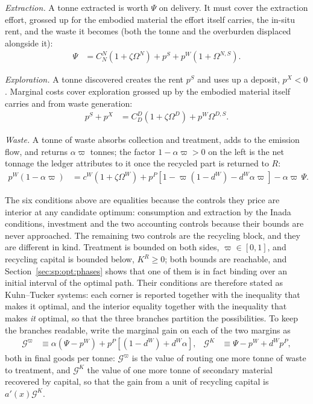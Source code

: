 \emph{Extraction.} A tonne extracted is worth $\Psi$ on delivery. It must cover the extraction effort, grossed up for the embodied material the effort itself carries, the in-situ rent, and the waste it becomes (both the tonne and the overburden displaced alongside it):
\begin{align}
\Psi &= C^N_N\left(1+\zeta\Omega^N\right)+p^S+p^W\left(1+\Omega^{N,S}\right).
\label{eq:sp:sum:N}
\end{align}

\emph{Exploration.} A tonne discovered creates the rent $p^S$ and uses up a deposit, $p^X<0$. Marginal costs cover exploration grossed up by the embodied material itself carries and from waste generation:  
\begin{align}
p^S+p^X &= C^D_D\left(1+\zeta\Omega^D\right)+p^W\Omega^{D,S} .
\label{eq:sp:sum:D}
\end{align}

\emph{Waste.} A tonne of waste absorbs collection and treatment, adds to the emission flow, and returns $\alpha\varpi$ tonnes; the factor $1-\alpha\varpi>0$ on the left is the net tonnage the ledger attributes to it once the recycled part is returned to $R$:
\begin{align}
p^W\left(1-\alpha\varpi\right) &= c^W\left(1+\zeta\Omega^W\right)+p^P\left[1-\varpi\left(1-d^W\right)-d^W\alpha\varpi\right]-\alpha\varpi\,\Psi .
\label{eq:sp:sum:W}
\end{align}

 The six conditions above are equalities because the controls
they price are interior at any candidate optimum: consumption and extraction by the Inada conditions,
investment and the two accounting controls because their bounds are never approached. The remaining
two controls are the recycling block, and they are different in kind. Treatment is bounded on both
sides, $\varpi\in\left[0,1\right]$, and recycling capital is bounded below, $K^R\ge0$; both bounds are
reachable, and Section~\ref{sec:sp:opt:phases} shows that one of them is in fact binding over an
initial interval of the optimal path. Their conditions are therefore stated as Kuhn--Tucker systems:
each corner is reported together with the inequality that makes it optimal, and the interior equality
together with the inequality that makes \emph{it} optimal, so that the three branches partition the
possibilities. To keep the branches readable, write the marginal gain on each of the two margins as
\begin{align}
\mathcal G^{\varpi} &\equiv \alpha\left(\Psi-p^W\right)+p^P\left[\left(1-d^W\right)+d^W\alpha\right],
&
\mathcal G^{K} &\equiv \Psi-p^W+d^Wp^P,
\label{eq:sp:sum:gains}
\end{align}
both in final goods per tonne: $\mathcal G^\varpi$ is the value of routing one more tonne of waste to
treatment, and $\mathcal G^{K}$ the value of one more tonne of secondary material recovered by
capital, so that the gain from a unit of recycling capital is $a'\!\left(x\right)\mathcal G^K$.


